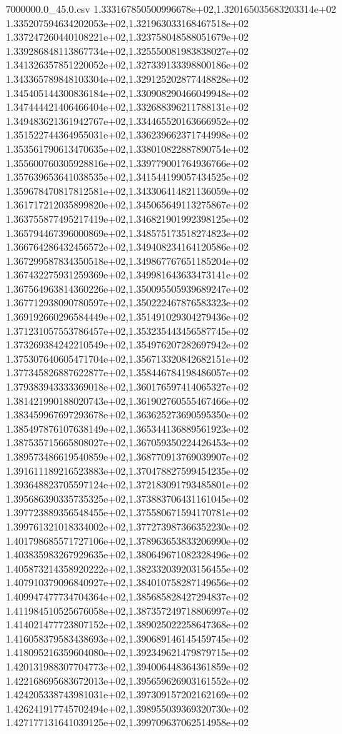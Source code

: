 \begin{filecontents*}{7000000.0_45.0.csv}
1.333167850500996678e+02,1.320165035683203314e+02
1.335207594634202053e+02,1.321963033168467518e+02
1.337247260440108221e+02,1.323758048588051679e+02
1.339286848113867734e+02,1.325550081983838027e+02
1.341326357851220052e+02,1.327339133398800186e+02
1.343365789848103304e+02,1.329125202877448828e+02
1.345405144300836184e+02,1.330908290466049948e+02
1.347444421406466404e+02,1.332688396211788131e+02
1.349483621361942767e+02,1.334465520163666952e+02
1.351522744364955031e+02,1.336239662371744998e+02
1.353561790613470635e+02,1.338010822887890754e+02
1.355600760305928816e+02,1.339779001764936766e+02
1.357639653641038535e+02,1.341544199057434525e+02
1.359678470817812581e+02,1.343306414821136059e+02
1.361717212035899820e+02,1.345065649113275867e+02
1.363755877495217419e+02,1.346821901992398125e+02
1.365794467396000869e+02,1.348575173518274823e+02
1.366764286432456572e+02,1.349408234164120586e+02
1.367299587834350518e+02,1.349867767651185204e+02
1.367432275931259369e+02,1.349981643633473141e+02
1.367564963814360226e+02,1.350095505939689247e+02
1.367712938090780597e+02,1.350222467876583323e+02
1.369192660296584449e+02,1.351491029304279436e+02
1.371231057553786457e+02,1.353235443456587745e+02
1.373269384242210549e+02,1.354976207282697942e+02
1.375307640605471704e+02,1.356713320842682151e+02
1.377345826887622877e+02,1.358446784198486057e+02
1.379383943333369018e+02,1.360176597414065327e+02
1.381421990188020743e+02,1.361902760555467466e+02
1.383459967697293678e+02,1.363625273690595350e+02
1.385497876107638149e+02,1.365344136889561923e+02
1.387535715665808027e+02,1.367059350224426453e+02
1.389573486619540859e+02,1.368770913769039907e+02
1.391611189216523883e+02,1.370478827599454235e+02
1.393648823705597124e+02,1.372183091793485801e+02
1.395686390335735325e+02,1.373883706431161045e+02
1.397723889356548455e+02,1.375580671594170781e+02
1.399761321018334002e+02,1.377273987366352230e+02
1.401798685571727106e+02,1.378963653833206990e+02
1.403835983267929635e+02,1.380649671082328496e+02
1.405873214358920222e+02,1.382332039203156455e+02
1.407910379096840927e+02,1.384010758287149656e+02
1.409947477734704364e+02,1.385685828427294837e+02
1.411984510525676058e+02,1.387357249718806997e+02
1.414021477723807152e+02,1.389025022258647368e+02
1.416058379583438693e+02,1.390689146145459745e+02
1.418095216359604080e+02,1.392349621479879715e+02
1.420131988307704773e+02,1.394006448364361859e+02
1.422168695683672013e+02,1.395659626903161552e+02
1.424205338743981031e+02,1.397309157202162169e+02
1.426241917745702494e+02,1.398955039369320730e+02
1.427177131641039125e+02,1.399709637062514958e+02

\end{filecontents*}
